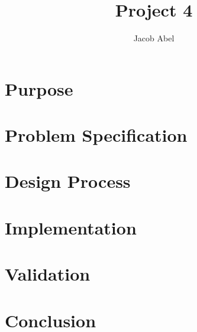 \documentclass[12pt,letterpaper,titlepage]{article}
\author{Jacob Abel}
\title{Project 4}
\begin{document}
\maketitle


\tableofcontents
\pagebreak
\listoftables

\listoffigures

\pagebreak
\begin{raggedright}

\section{Purpose}

\section{Problem Specification}

\section{Design Process}

\section{Implementation}

\section{Validation}

\section{Conclusion}

%

\end{raggedright}
\end{document}
